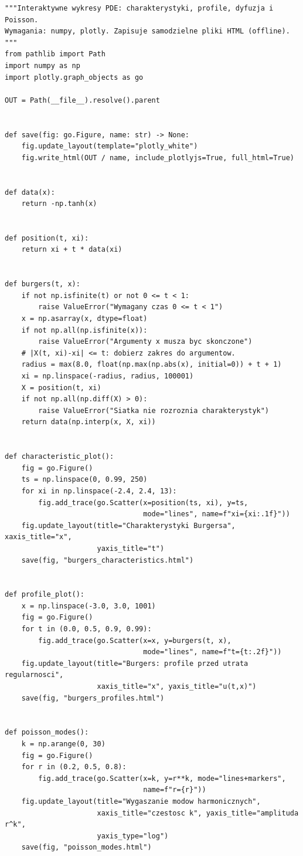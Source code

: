 \begin{lstlisting}[style=pythonpde,caption={Burgers, funkcje harmoniczne i dyfuzja: Plotly},label={code:pde-old}]
"""Interaktywne wykresy PDE: charakterystyki, profile, dyfuzja i Poisson.
Wymagania: numpy, plotly. Zapisuje samodzielne pliki HTML (offline).
"""
from pathlib import Path
import numpy as np
import plotly.graph_objects as go

OUT = Path(__file__).resolve().parent


def save(fig: go.Figure, name: str) -> None:
    fig.update_layout(template="plotly_white")
    fig.write_html(OUT / name, include_plotlyjs=True, full_html=True)


def data(x):
    return -np.tanh(x)


def position(t, xi):
    return xi + t * data(xi)


def burgers(t, x):
    if not np.isfinite(t) or not 0 <= t < 1:
        raise ValueError("Wymagany czas 0 <= t < 1")
    x = np.asarray(x, dtype=float)
    if not np.all(np.isfinite(x)):
        raise ValueError("Argumenty x musza byc skonczone")
    # |X(t, xi)-xi| <= t: dobierz zakres do argumentow.
    radius = max(8.0, float(np.max(np.abs(x), initial=0)) + t + 1)
    xi = np.linspace(-radius, radius, 100001)
    X = position(t, xi)
    if not np.all(np.diff(X) > 0):
        raise ValueError("Siatka nie rozroznia charakterystyk")
    return data(np.interp(x, X, xi))


def characteristic_plot():
    fig = go.Figure()
    ts = np.linspace(0, 0.99, 250)
    for xi in np.linspace(-2.4, 2.4, 13):
        fig.add_trace(go.Scatter(x=position(ts, xi), y=ts,
                                 mode="lines", name=f"xi={xi:.1f}"))
    fig.update_layout(title="Charakterystyki Burgersa", xaxis_title="x",
                      yaxis_title="t")
    save(fig, "burgers_characteristics.html")


def profile_plot():
    x = np.linspace(-3.0, 3.0, 1001)
    fig = go.Figure()
    for t in (0.0, 0.5, 0.9, 0.99):
        fig.add_trace(go.Scatter(x=x, y=burgers(t, x),
                                 mode="lines", name=f"t={t:.2f}"))
    fig.update_layout(title="Burgers: profile przed utrata regularnosci",
                      xaxis_title="x", yaxis_title="u(t,x)")
    save(fig, "burgers_profiles.html")


def poisson_modes():
    k = np.arange(0, 30)
    fig = go.Figure()
    for r in (0.2, 0.5, 0.8):
        fig.add_trace(go.Scatter(x=k, y=r**k, mode="lines+markers",
                                 name=f"r={r}"))
    fig.update_layout(title="Wygaszanie modow harmonicznych",
                      xaxis_title="czestosc k", yaxis_title="amplituda r^k",
                      yaxis_type="log")
    save(fig, "poisson_modes.html")



\end{lstlisting}
